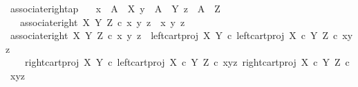 \begin{isabellebody}
\endisatagproof
{\isafoldproof}%
%
\isadelimproof
\isanewline
%
\endisadelimproof
\isanewline
{}\isamarkupfalse%
\ associate{\isacharunderscore}{\kern0pt}right{\isacharunderscore}{\kern0pt}ap{\isacharcolon}{\kern0pt}\isanewline
\ \ \ {\isachardoublequoteopen}x\ {\isacharcolon}{\kern0pt}\ A\ {\isasymrightarrow}\ X{\isachardoublequoteclose}\ {\isachardoublequoteopen}y\ {\isacharcolon}{\kern0pt}\ A\ {\isasymrightarrow}\ Y{\isachardoublequoteclose}\ {\isachardoublequoteopen}z\ {\isacharcolon}{\kern0pt}\ A\ {\isasymrightarrow}\ Z{\isachardoublequoteclose}\isanewline
\ \ \ {\isachardoublequoteopen}associate{\isacharunderscore}{\kern0pt}right\ X\ Y\ Z\ {\isasymcirc}\isactrlsub c\ {\isasymlangle}{\isasymlangle}x{\isacharcomma}{\kern0pt}\ y{\isasymrangle}{\isacharcomma}{\kern0pt}\ z{\isasymrangle}\ {\isacharequal}{\kern0pt}\ {\isasymlangle}x{\isacharcomma}{\kern0pt}\ {\isasymlangle}y{\isacharcomma}{\kern0pt}\ z{\isasymrangle}{\isasymrangle}{\isachardoublequoteclose}\isanewline
%
\isadelimproof
%
\endisadelimproof
%
\isatagproof
{}\isamarkupfalse%
\ {\isacharminus}{\kern0pt}\isanewline
\ \ \isamarkupfalse%
\ {\isachardoublequoteopen}associate{\isacharunderscore}{\kern0pt}right\ X\ Y\ Z\ {\isasymcirc}\isactrlsub c\ {\isasymlangle}{\isasymlangle}x{\isacharcomma}{\kern0pt}\ y{\isasymrangle}{\isacharcomma}{\kern0pt}\ z{\isasymrangle}\ {\isacharequal}{\kern0pt}\ {\isasymlangle}{\isacharparenleft}{\kern0pt}left{\isacharunderscore}{\kern0pt}cart{\isacharunderscore}{\kern0pt}proj\ X\ Y\ {\isasymcirc}\isactrlsub c\ left{\isacharunderscore}{\kern0pt}cart{\isacharunderscore}{\kern0pt}proj\ {\isacharparenleft}{\kern0pt}X\ {\isasymtimes}\isactrlsub c\ Y{\isacharparenright}{\kern0pt}\ Z{\isacharparenright}{\kern0pt}\ {\isasymcirc}\isactrlsub c\ {\isasymlangle}{\isasymlangle}x{\isacharcomma}{\kern0pt}y{\isasymrangle}{\isacharcomma}{\kern0pt}z{\isasymrangle}{\isacharcomma}{\kern0pt}\ \isanewline
\ \ \ \ {\isasymlangle}{\isacharparenleft}{\kern0pt}right{\isacharunderscore}{\kern0pt}cart{\isacharunderscore}{\kern0pt}proj\ X\ Y\ {\isasymcirc}\isactrlsub c\ left{\isacharunderscore}{\kern0pt}cart{\isacharunderscore}{\kern0pt}proj\ {\isacharparenleft}{\kern0pt}X\ {\isasymtimes}\isactrlsub c\ Y{\isacharparenright}{\kern0pt}\ Z{\isacharparenright}{\kern0pt}\ {\isasymcirc}\isactrlsub c\ {\isasymlangle}{\isasymlangle}x{\isacharcomma}{\kern0pt}y{\isasymrangle}{\isacharcomma}{\kern0pt}z{\isasymrangle}{\isacharcomma}{\kern0pt}\ right{\isacharunderscore}{\kern0pt}cart{\isacharunderscore}{\kern0pt}proj\ {\isacharparenleft}{\kern0pt}X\ {\isasymtimes}\isactrlsub c\ Y{\isacharparenright}{\kern0pt}\ Z\ {\isasymcirc}\isactrlsub c\ {\isasymlangle}{\isasymlangle}x{\isacharcomma}{\kern0pt}y{\isasymrangle}{\isacharcomma}{\kern0pt}z{\isasymrangle}{\isasymrangle}{\isasymrangle}{\isachardoublequoteclose}\isanewline

\end{isabellebody}
